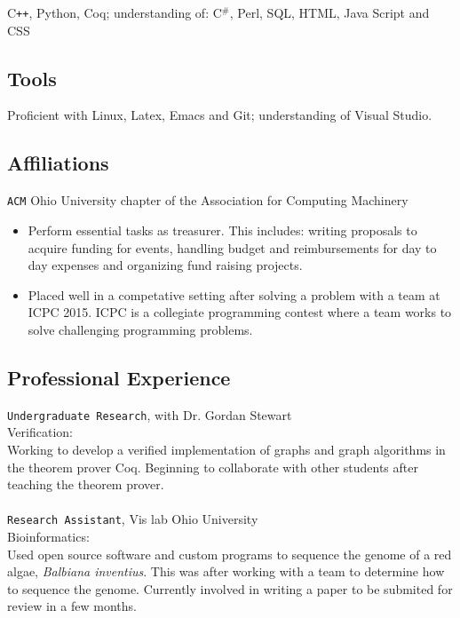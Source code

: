 \documentclass[11pt]{article} %
\begin{document}
C\texttt{++}, Python, Coq; understanding of: C$^\texttt{\#}$, Perl, SQL, HTML, Java Script and CSS 
\subsection*{Tools}
Proficient with Linux, Latex, Emacs and Git; understanding of Visual Studio.


\subsection*{Affiliations}
\texttt{ACM} Ohio University chapter of the Association for Computing Machinery
\begin{itemize}
\item Perform essential tasks as treasurer. This includes: writing proposals to acquire funding for events, handling budget and reimbursements for day to day expenses and organizing fund raising projects.
\item Placed well in a competative setting after solving a problem with a team at ICPC 2015. ICPC is a collegiate programming contest where a team works to solve challenging programming problems. 
\end{itemize}
\subsection*{Professional Experience} 
\texttt{Undergraduate Research}, with Dr. Gordan Stewart \\
Verification: \\
Working to develop a verified implementation of graphs and graph algorithms in the theorem prover Coq.  Beginning to collaborate with other students after teaching the theorem prover.\\ \\
\texttt{Research Assistant}, Vis lab Ohio University \\
Bioinformatics: \\
Used open source software and custom programs to sequence the genome of a red algae,\textit{ Balbiana inventius}. This was after working with a team to determine how to sequence the genome. Currently involved in writing a paper to be submited for review in a few months.
           
\end{document}
